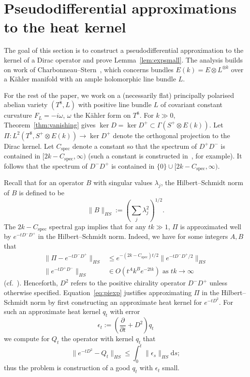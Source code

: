 \documentclass{article}
\newcommand{\di}{\mathrm{d}}
\newcommand{\cspec}{C_{\mathrm{spec}}}
\theoremstyle{definition}
\theoremstyle{remark}
\begin{document}
\section{Pseudodifferential approximations to the heat kernel}
\label{sec:pseudo}

The goal of this section is to construct a pseudodifferential approximation to the kernel of a Dirac operator and prove Lemma~\ref{lem:expsmall}.
The analysis builds on work of Charbonneau--Stern~\cite{charbonneauAsymptoticHodgeTheory2015}, which concerns bundles $E(k) = E \otimes L^{\otimes k}$ over a K\"ahler manifold with an ample holomorphic line bundle $L$.

 
For the rest of the paper, we work on a (necessarily flat) principally polarised abelian variety $(T^8, L)$ with positive line bundle $L$ of covariant constant curvature $F_L = -i \omega$, $\omega$ the K\"ahler form on $T^8$.
For $k \gg 0$, Theorem~\ref{thm:vanishing} gives $\ker D = \ker D^+ \subset \Gamma(S^+ \otimes E(k))$.
Let $\Pi \colon L^2(T^8, S^+ \otimes E(k)) \to \ker D^+$ denote the orthogonal projection to the Dirac kernel.
Let $\cspec$ denote a constant so that the spectrum of $D^+ D^-$ is contained in $[2k-\cspec, \infty)$ (such a constant is constructed in~\cite[\S 4.5]{bravermanVanishingTheoremsKernel1998}, for example).
It follows that the spectrum of $D^- D^+$ is contained in $\{0\} \cup [2k-\cspec, \infty)$.

Recall that for an operator $B$ with singular values $\lambda_j$, the Hilbert--Schmidt norm of $B$ is defined to be 
\[
    \| B\|_{HS} := \left(\sum_j \lambda_j^2\right)^{1/2}.
\]
The $2k - \cspec$ spectral gap implies that for any $tk \gg 1$, $\Pi$ is approximated well by $e^{-tD^- D^+}$ in the Hilbert--Schmidt norm.
Indeed, we have for some integers $A,B$ that
\begin{align}
    \label{eq:piexp} \| \Pi - e^{-tD^- D^+}\|_{HS} &\le e^{-(2k-\cspec)t/2} \| e^{-tD^- D^+/2}\|_{HS} \\
    \label{eq:epmdecay} \| e^{-tD^+ D^-}\|_{HS} &\in O(t^A k^B e^{-2tk}) \text{ as $tk \to \infty$}
\end{align}
(cf.~\cite[Equation~(2.10)]{charbonneauAsymptoticHodgeTheory2015}).
Henceforth, $D^2$ refers to the positive chirality operator $D^- D^+$ unless otherwise specified.
Equation~\eqref{eq:piexp} justifies approximating $\Pi$ in the Hilbert--Schmidt norm by first constructing an approximate heat kernel for $e^{-tD^2}$.
For such an approximate heat kernel $q_t$ with error
\begin{equation}
    \label{eq:epsilon}
    \epsilon_t := \left(\frac{\partial}{\partial t} + D^2 \right) q_t
\end{equation}
we compute for $Q_t$ the operator with kernel $q_t$ that
\begin{equation}
    \label{eq:expapprox}
    \|e^{-tD^2} - Q_t\|_{HS} \le \int_0^t \|\epsilon_s\|_{HS} \di s;
\end{equation}
thus the problem is construction of a good $q_t$ with $\epsilon_t$ small.
\end{document}
